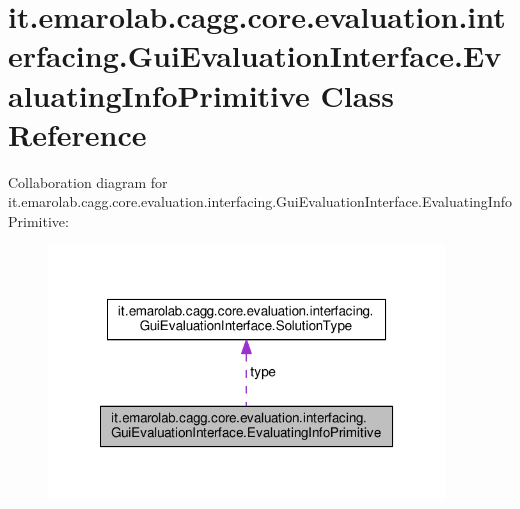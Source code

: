 \hypertarget{classit_1_1emarolab_1_1cagg_1_1core_1_1evaluation_1_1interfacing_1_1GuiEvaluationInterface_1_1EvaluatingInfoPrimitive}{\section{it.\-emarolab.\-cagg.\-core.\-evaluation.\-interfacing.\-Gui\-Evaluation\-Interface.\-Evaluating\-Info\-Primitive Class Reference}
\label{classit_1_1emarolab_1_1cagg_1_1core_1_1evaluation_1_1interfacing_1_1GuiEvaluationInterface_1_1EvaluatingInfoPrimitive}
}


Collaboration diagram for it.\-emarolab.\-cagg.\-core.\-evaluation.\-interfacing.\-Gui\-Evaluation\-Interface.\-Evaluating\-Info\-Primitive\-:\nopagebreak
\begin{figure}[H]
\begin{center}
\leavevmode
\includegraphics[width=298pt]{classit_1_1emarolab_1_1cagg_1_1core_1_1evaluation_1_1interfacing_1_1GuiEvaluationInterface_1_1Ev5226cb60b600aa9d5f0e349bae1599bd}
\end{center}
\end{figure}
